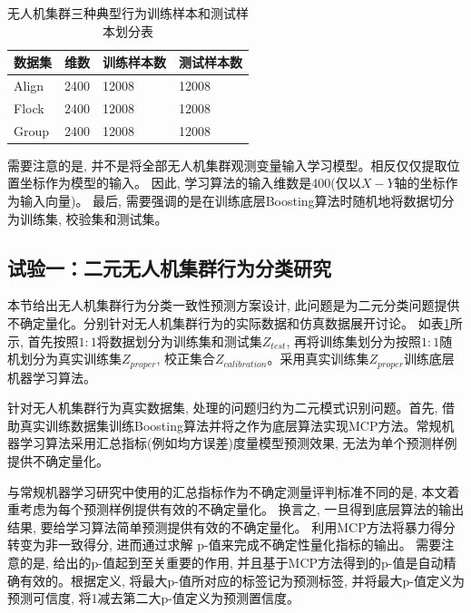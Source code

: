 \begin{table}[]
\centering
\caption{无人机集群三种典型行为训练样本和测试样本划分表}
\label{tab:train_test}
\begin{tabular}{@{}llll@{}}
\toprule
数据集 & 维数  & 训练样本数 & 测试样本数  \\ \midrule
Align    & 2400 & 12008     & 12008 \\
Flock    & 2400 & 12008     & 12008 \\
Group    & 2400 & 12008     & 12008 \\ \bottomrule
\end{tabular}
\end{table} 

需要注意的是, 并不是将全部无人机集群观测变量输入学习模型。相反仅仅提取位置坐标作为模型的输入。 因此, 学习算法的输入维数是400(仅以$X-Y$轴的坐标作为输入向量)。 最后, 需要强调的是在训练底层Boosting算法时随机地将数据切分为训练集, 校验集和测试集。 

\subsection{试验一：二元无人机集群行为分类研究}
本节给出无人机集群行为分类一致性预测方案设计, 此问题是为二元分类问题提供不确定量化。分别针对无人机集群行为的实际数据和仿真数据展开讨论。 如表\ref{tab:train_test}所示, 首先按照$1:1$将数据划分为训练集和测试集$Z_{test}$, 再将训练集划分为按照$1:1$随机划分为真实训练集$Z_{proper}$, 校正集合$Z_{calibration}$。采用真实训练集$Z_{proper}$训练底层机器学习算法。


针对无人机集群行为真实数据集, 处理的问题归约为二元模式识别问题。首先, 借助真实训练数据集训练Boosting算法并将之作为底层算法实现MCP方法。常规机器学习算法采用汇总指标(例如均方误差)度量模型预测效果, 无法为单个预测样例提供不确定量化。

与常规机器学习研究中使用的汇总指标作为不确定测量评判标准不同的是, 本文着重考虑为每个预测样例提供有效的不确定量化。 换言之, 一旦得到底层算法的输出结果, 要给学习算法简单预测提供有效的不确定量化。 利用MCP方法将暴力得分转变为非一致得分, 进而通过求解 p-值来完成不确定性量化指标的输出。 需要注意的是, 给出的p-值起到至关重要的作用, 并且基于MCP方法得到的p-值是自动精确有效的。根据定义, 将最大p-值所对应的标签记为预测标签, 并将最大p-值定义为预测可信度, 将1减去第二大p-值定义为预测置信度。 

